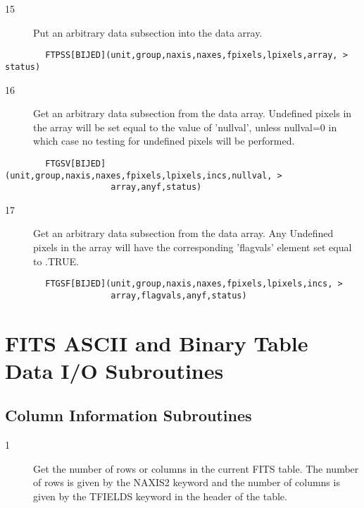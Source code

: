 \documentclass[11pt]{book}
\begin{document}
\begin{description}
\item[15]   Put an arbitrary data subsection into the data array.
\end{description}

\begin{verbatim}
        FTPSS[BIJED](unit,group,naxis,naxes,fpixels,lpixels,array, > status)
\end{verbatim}

\begin{description}
\item[16]    Get an arbitrary data subsection from the data array.  Undefined
       pixels in the array will be set equal to the value of 'nullval',
       unless nullval=0 in which case no testing for undefined pixels will
      be performed.
\end{description}

\begin{verbatim}
        FTGSV[BIJED](unit,group,naxis,naxes,fpixels,lpixels,incs,nullval, >
                     array,anyf,status)
\end{verbatim}

\begin{description}
\item[17]    Get an arbitrary data subsection from the data array.  Any Undefined
       pixels in the array will have the corresponding 'flagvals'
      element set equal to .TRUE.
\end{description}

\begin{verbatim}
        FTGSF[BIJED](unit,group,naxis,naxes,fpixels,lpixels,incs, >
                     array,flagvals,anyf,status)
\end{verbatim}


\section{FITS ASCII and Binary Table Data I/O Subroutines}


\subsection{Column Information Subroutines \label{FTGCNO}}


\begin{description}
\item[1 ]  Get the number of rows or columns in the current FITS table.
     The number of rows is given by the NAXIS2 keyword and the
     number of columns is given by the TFIELDS keyword in the header
    of the table.
\end{description}
\end{document}

